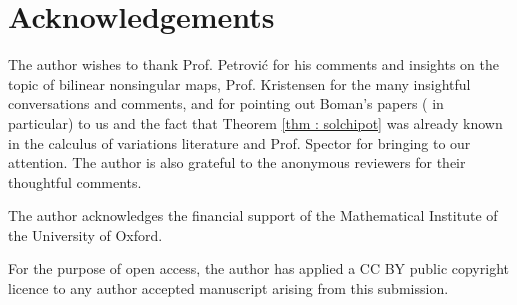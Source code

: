 \documentclass[11pt, a4paper, reqno]{elsarticle}
\theoremstyle{definition}
\theoremstyle{remark}
\begin{document}
\section*{Acknowledgements}
The author wishes to thank Prof. Petrovi\'{c}
for his comments and insights on the 
topic of bilinear nonsingular maps,
Prof. Kristensen for
the many insightful conversations and 
comments, and for pointing out 
Boman's papers (\cite{Boman1967PartialSpaces} in particular) to us and
 the fact that Theorem \ref{thm : solchipot} was already
known in the calculus of variations literature
and Prof. Spector for bringing \cite{DeFigueiredo} 
to our attention. The author is also grateful 
to the anonymous reviewers for their thoughtful comments.\par
The author acknowledges the financial support of 
the Mathematical Institute of the University of Oxford.\par
For the purpose of open access, the author has applied a CC BY public copyright licence to any author accepted manuscript arising from this submission.
   
                 
\end{document}
